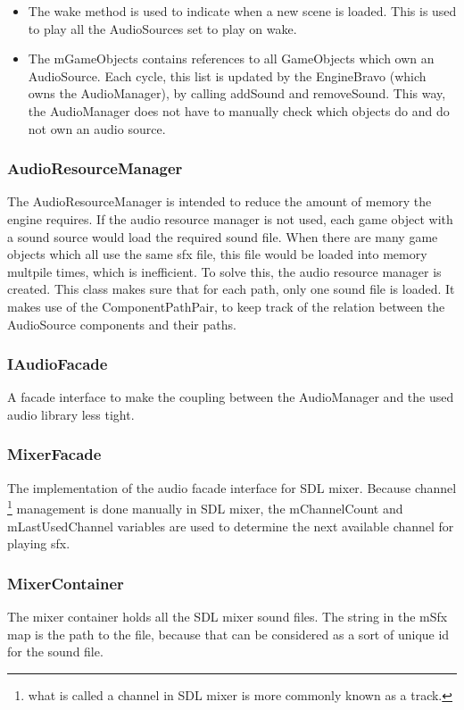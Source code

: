 \documentclass{article}
\begin{document}
\begin{itemize}
  \item The wake method is used to indicate when a new scene is loaded. This is used to play all the AudioSources set to play on wake.
  \item The mGameObjects contains references to all GameObjects which own an AudioSource. Each cycle, this list is updated by the EngineBravo (which owns the AudioManager), by calling addSound and removeSound. This way, the AudioManager does not have to manually check which objects do and do not own an audio source.
\end{itemize}

\subsubsection{AudioResourceManager}
The AudioResourceManager is intended to reduce the amount of memory the engine requires.
If the audio resource manager is not used, each game object with a sound source would load the required sound file.
When there are many game objects which all use the same sfx file, this file would be loaded into memory multpile times, which is inefficient.
To solve this, the audio resource manager is created. This class makes sure that for each path, only one sound file is loaded.
It makes use of the ComponentPathPair, to keep track of the relation between the AudioSource components and their paths.

\subsubsection{IAudioFacade}
A facade interface to make the coupling between the AudioManager and the used audio library less tight.

\subsubsection{MixerFacade}
The implementation of the audio facade interface for SDL mixer.
Because channel \footnote{what is called a channel in SDL mixer is more commonly known as a track.} management is done
manually in SDL mixer, the mChannelCount and mLastUsedChannel variables are used to determine the next available channel for playing sfx.

\subsubsection{MixerContainer}
The mixer container holds all the 
SDL mixer sound files.
The string in the mSfx map is the path to the file, because that can be considered as a sort of unique id for the sound file.
\end{document}
